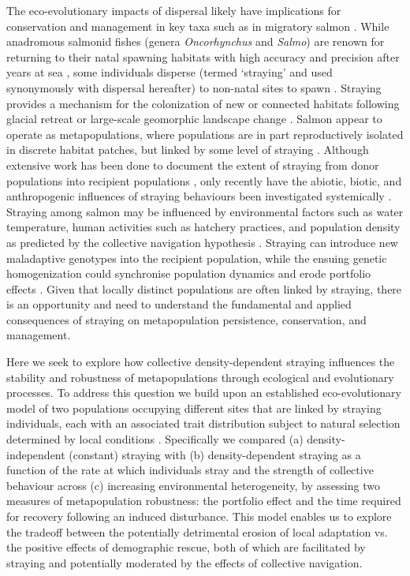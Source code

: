 \documentclass{revtex4}
\begin{document}
The eco-evolutionary impacts of dispersal likely have implications for conservation and management in key taxa such as in migratory salmon \citep{Brenner:2012gl,Johnson:2012fe,Fullerton:2011ii}.
While anadromous salmonid fishes (genera \emph{Oncorhynchus} and \emph{Salmo}) are renown for returning to their natal spawning habitats with high accuracy and precision after years at sea \citep{Quinn:2011tf,Jonsson:2011kg,Keefer:2014gg}, some individuals disperse (termed `straying' and used synonymously with dispersal hereafter) to non-natal sites to spawn \citep{Quinn:1993ge,Hendry:2004wf}.
Straying provides a mechanism for the colonization of new or connected habitats following glacial retreat or large-scale geomorphic landscape change \citep{Hendry:2004wf}.
Salmon appear to operate as metapopulations, where populations are in part reproductively isolated in discrete habitat patches, but linked by some level of straying \citep{Schtickzelle:2007wb,Anderson:2014cx}.
Although extensive work has been done to document the extent of straying from donor populations into recipient populations \citep{Keefer:2014gg,Bett:2017ha}, only recently have the abiotic, biotic, and anthropogenic influences of straying behaviours been investigated systemically \citep{Keefer:2008bs,Westley:2015to,Bond:2016dz}.
Straying among salmon may be influenced by environmental factors such as water temperature, human activities such as hatchery practices, and population density as predicted by the collective navigation hypothesis \citep{Peterson:2014gy,Berdahl:2017uu}.
Straying can introduce new maladaptive genotypes into the recipient population, while the ensuing genetic homogenization could synchronise population dynamics and erode portfolio effects \citep{Moore:2010gs,Carlson:2011ce,Braun:2016ib}.
Given that locally distinct populations are often linked by straying, there is an opportunity and need to understand the fundamental and applied consequences of straying on metapopulation persistence, conservation, and management.

Here we seek to explore how collective density-dependent straying influences the stability and robustness of metapopulations through ecological and evolutionary processes.
To address this question we build upon an established eco-evolutionary model of two populations occupying different sites that are linked by straying individuals, each with an associated trait distribution subject to natural selection determined by local conditions \citep{Ronce:2001dp}.
Specifically we compared (a) density-independent (constant) straying with (b) density-dependent straying as a function of the rate at which individuals stray and the strength of collective behaviour across (c) increasing environmental heterogeneity, by assessing two measures of metapopulation robustness: the portfolio effect and the time required for recovery following an induced disturbance. 
This model enables us to explore the tradeoff between the potentially detrimental erosion of local adaptation vs. the positive effects of demographic rescue, both of which are facilitated by straying and potentially moderated by the effects of collective navigation. 
\end{document}

